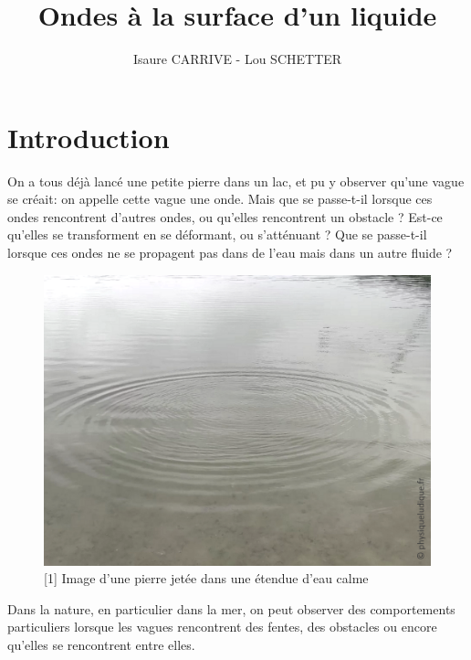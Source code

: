 \documentclass{report}
\title{Ondes à la surface d'un liquide }
\author{Isaure CARRIVE - Lou SCHETTER}
\begin{document}
\maketitle

\large{\tableofcontents}

\newpage
\chapter{Introduction}
On a tous déjà lancé une petite pierre dans un lac, et pu y observer qu'une vague se créait: on appelle cette vague une onde. Mais que se passe-t-il lorsque ces ondes rencontrent d'autres ondes, ou qu'elles rencontrent un obstacle ? Est-ce qu'elles se transforment en se déformant, ou s'atténuant ? Que se passe-t-il lorsque ces ondes ne se propagent pas dans de l'eau mais dans un autre fluide ?


\begin{figure}[H]
    \centering
    \includegraphics[scale=0.2]{im_intro.png}
    \caption{[1] Image d'une pierre jetée dans une étendue d'eau calme}
    \label{}
\end{figure}

Dans la nature, en particulier dans la mer, on peut observer des comportements particuliers lorsque les vagues rencontrent des fentes, des obstacles ou encore qu'elles se rencontrent entre elles.
\end{document}
